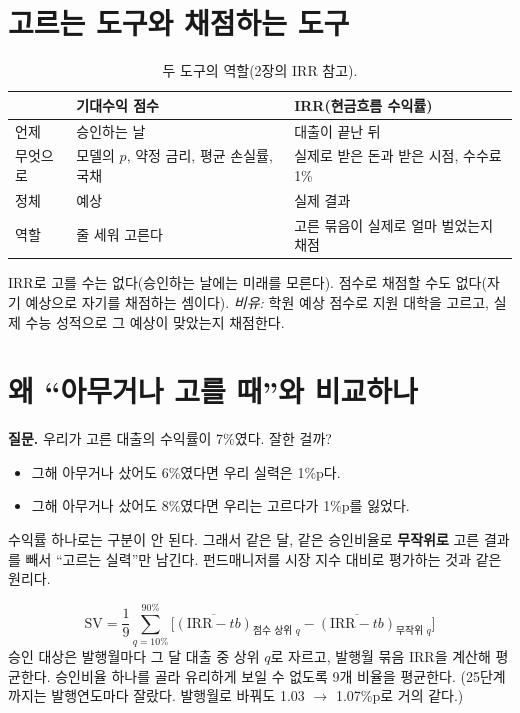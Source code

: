 \section{고르는 도구와 채점하는 도구}
\begin{table}[H]\centering\small
\begin{tabularx}{\linewidth}{@{}p{24mm}LL@{}}\toprule
 & 기대수익 점수 & IRR(현금흐름 수익률)\\\midrule
언제 & 승인하는 날 & 대출이 끝난 뒤\\
무엇으로 & 모델의 $p$, 약정 금리, 평균 손실률, 국채 & 실제로 받은 돈과 받은 시점, 수수료 1\%\\
정체 & 예상 & 실제 결과\\
역할 & 줄 세워 고른다 & 고른 묶음이 실제로 얼마 벌었는지 채점\\\bottomrule
\end{tabularx}
\caption{두 도구의 역할(2장의 IRR 참고).}
\end{table}
IRR로 고를 수는 없다(승인하는 날에는 미래를 모른다). 점수로 채점할 수도 없다(자기 예상으로 자기를 채점하는 셈이다). \textit{비유:} 학원 예상 점수로 지원 대학을 고르고, 실제 수능 성적으로 그 예상이 맞았는지 채점한다.

\section{왜 ``아무거나 고를 때''와 비교하나}
\textbf{질문.} 우리가 고른 대출의 수익률이 7\%였다. 잘한 걸까?
\begin{itemize}[leftmargin=*]
\item 그해 아무거나 샀어도 6\%였다면 우리 실력은 1\%p다.
\item 그해 아무거나 샀어도 8\%였다면 우리는 고르다가 1\%p를 잃었다.
\end{itemize}
수익률 하나로는 구분이 안 된다. 그래서 같은 달, 같은 승인비율로 \textbf{무작위로} 고른 결과를 빼서 ``고르는 실력''만 남긴다. 펀드매니저를 시장 지수 대비로 평가하는 것과 같은 원리다.

\begin{formulabox}[선별 가치]
\[ \mathrm{SV}=\frac19\sum_{q=10\%}^{90\%}\Big[\overline{(\mathrm{IRR}-tb)}_{\text{점수 상위 }q}-\overline{(\mathrm{IRR}-tb)}_{\text{무작위 }q}\Big] \]
승인 대상은 발행월마다 그 달 대출 중 상위 $q$로 자르고, 발행월 묶음 IRR을 계산해 평균한다. 승인비율 하나를 골라 유리하게 보일 수 없도록 9개 비율을 평균한다. (25단계까지는 발행연도마다 잘랐다. 발행월로 바꿔도 1.03 \ensuremath{\to} 1.07\%p로 거의 같다.)
\end{formulabox}


